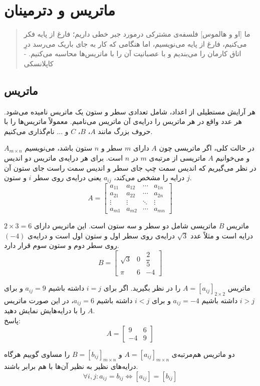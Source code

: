 \chapter{ماتریس و دترمینان}
\thispagestyle{empty}

\begin{quote}
	{\lotus
		ما [او و هالموس] فلسفه‌ی مشترکی درمورد جبر خطی داریم؛ فارغ از پایه فکر می‌کنیم، فارغ از پایه می‌نویسیم، اما هنگامی که کار به جای باریک می‌رسد درِ اتاق کارمان را می‌بندیم و با عصبانیت آن را با ماتریس‌ها محاسبه می‌کنیم. \quad - کاپلانسکی%
	}
\end{quote}

\section{ماتریس}
 هر آرایش مستطیلی از اعداد، شامل تعدادی سطر و ستون یک ماتریس نامیده می‌شود. هر عدد واقع در هر ماتریس را درایه‌ی آن ماتریس می‌نامیم. معمولاً ماتریس‌ها را با حروف بزرگ مانند $A$، $B$، $C$ و ... نام‌گذاری می‌کنیم.

در حالت کلی، اگر ماتریسی چون $A$ دارای $m$ سطر و $n$ ستون باشد، می‌نویسیم
$A_{m \times n}$
و می‌خوانیم $A$ ماتریسی از مرتبه‌ی $m$ در $n$ است. برای هر درایه‌ی ماتریس دو اندیس در نظر می‌گیریم که اندیس سمت چپ جای سطر و اندیس سمت راست جای ستون آن درایه را مشخص می‌کند،
$a_{ij}$
یعنی درایه‌ی روی سطر $i$ و ستون $j$.
\[
A = \begin{bmatrix}
	a_{11} & a_{12} & \cdots & a_{1n} \\
	a_{21} & a_{22} & \cdots & a_{2n} \\
	\vdots & \vdots & \ddots & \vdots \\
	a_{m1} & a_{m2} & \cdots & a_{mn}
\end{bmatrix}
\]

\begin{example}
	ماتریس $B$ ماتریسی شامل دو سطر و سه ستون است. این ماتریس دارای
	$2 \times 3 = 6$
	درایه است و مثلاً عدد
	$\sqrt{3}$
	درایه‌ی روی سطر اول و ستون اول است و درایه‌ی
	$(-4)$
	روی سطر دوم و ستون سوم قرار دارد.
	\[
	B = \begin{bmatrix}
		\sqrt{3} & 0 & \dfrac{2}{5} \\
		\pi & 6 & -4
	\end{bmatrix}
	\]
\end{example}

\begin{example}
	ماتریس
	$A=[a_{ij}]_{2 \times 2}$
	را در نظر بگیرید. اگر برای
	$i=j$
	داشته باشیم
	$a_{ij}=9$
	و برای
	$i>j$
	داشته باشیم
	$a_{ij}=-4$
	 و برای
	 $i<j$
	 داشته باشیم
	 $a_{ij}=6$،
	 در این صورت ماتریس $A$ را با درایه‌هایش نمایش دهید.
	 \\
	 پاسخ:
	 \[
	 A = \begin{bmatrix}
	 	9 & 6 \\
	 	-4 & 9
	 \end{bmatrix}
	 \]
\end{example}
\smallskip
دو ماتریس هم‌مرتبه‌ی
$A=[a_{ij}]_{m \times n}$
و
$B=[b_{ij}]_{m \times n}$
را مساوی گوییم هرگاه درایه‌های نظیر به نظیر آن‌ها با هم برابر باشند.
$$\forall i,j : a_{ij} = b_{ij} \Leftrightarrow [a_{ij}] = [b_{ij}]$$

